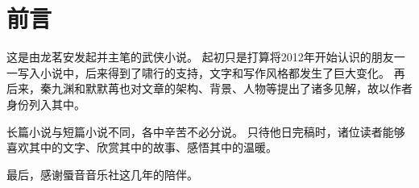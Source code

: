 \chapter*{前言}
这是由龙茗安发起并主笔的武侠小说。
起初只是打算将2012年开始认识的朋友一一写入小说中，后来得到了啸行的支持，文字和写作风格都发生了巨大变化。
再后来，秦九渊和默默苒也对文章的架构、背景、人物等提出了诸多见解，故以作者身份列入其中。

长篇小说与短篇小说不同，各中辛苦不必分说。
只待他日完稿时，诸位读者能够喜欢其中的文字、欣赏其中的故事、感悟其中的温暖。

最后，感谢蜃音音乐社这几年的陪伴。